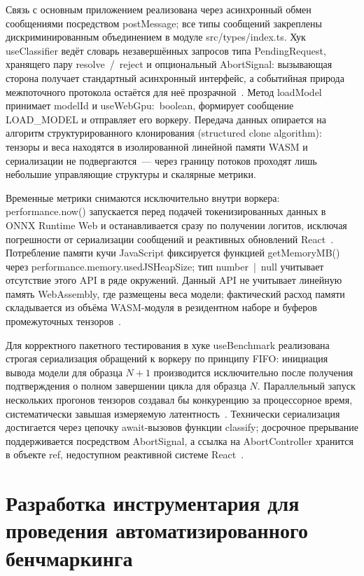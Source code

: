 Связь с основным приложением реализована через асинхронный обмен сообщениями посредством postMessage; все типы сообщений закреплены дискриминированным объединением в модуле src/types/index.ts. Хук useClassifier ведёт словарь незавершённых запросов типа PendingRequest, хранящего пару resolve~/~reject и опциональный AbortSignal: вызывающая сторона получает стандартный асинхронный интерфейс, а событийная природа межпоточного протокола остаётся для неё прозрачной~\cite{jia2024empowering}. Метод loadModel принимает modelId и useWebGpu:~boolean, формирует сообщение LOAD\_MODEL и отправляет его воркеру. Передача данных опирается на алгоритм структурированного клонирования (structured clone algorithm): тензоры и веса находятся в изолированной линейной памяти WASM и сериализации не подвергаются~— через границу потоков проходят лишь небольшие управляющие структуры и скалярные метрики.

Временные метрики снимаются исключительно внутри воркера: performance.now() запускается перед подачей токенизированных данных в ONNX Runtime Web и останавливается сразу по получении логитов, исключая погрешности от сериализации сообщений и реактивных обновлений React~\cite{wang2024anatomizing}. Потребление памяти кучи JavaScript фиксируется функцией getMemoryMB() через performance.memory.usedJSHeapSize; тип number~|~null учитывает отсутствие этого API в ряде окружений. Данный API не учитывает линейную память WebAssembly, где размещены веса модели; фактический расход памяти складывается из объёма WASM-модуля в резидентном наборе и буферов промежуточных тензоров~\cite{husom2025sustainable}.

Для корректного пакетного тестирования в хуке useBenchmark реализована строгая сериализация обращений к воркеру по принципу FIFO: инициация вывода модели для образца $N+1$ производится исключительно после получения подтверждения о полном завершении цикла для образца $N$. Параллельный запуск нескольких прогонов тензоров создавал бы конкуренцию за процессорное время, систематически завышая измеряемую латентность~\cite{wang2024anatomizing}. Технически сериализация достигается через цепочку await-вызовов функции classify; досрочное прерывание поддерживается посредством AbortSignal, а ссылка на AbortController хранится в объекте ref, недоступном реактивной системе React~\cite{jia2024empowering}.


\section{Разработка инструментария для проведения автоматизированного бенчмаркинга}
\label{sec:разработка_инструментария_для_проведения_автоматизированного_бенчмаркинга}

